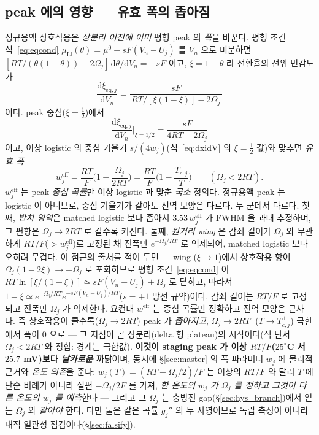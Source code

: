 \documentclass[11pt,a4paper]{article}
\newcommand{\dd}{\mathrm{d}}
\newcommand{\eff}{\mathrm{eff}}
\newcommand{\eq}{\mathrm{eq}}
\begin{document}
\subsection{peak 에의 영향 — 유효 폭의 좁아짐}
정규용액 상호작용은 \emph{상분리 이전에 이미} 평형 peak 의 \emph{폭}을 바꾼다. 평형 조건 식~\eqref{eq:eqcond}
$\mu_\mathrm{Li}(\theta)=\mu^0-sF(V_n-U_j)$ 를 $V_n$ 으로 미분하면 $[RT/(\theta(1-\theta))-2\Omega_j]\,\dd\theta/\dd V_n=-sF$
이고, $\xi=1-\theta$ 라 전환율의 전위 민감도가
\begin{equation}
\frac{\dd\xi_{\eq,j}}{\dd V_n}=\frac{sF}{\,RT/[\xi(1-\xi)]-2\Omega_j\,}
\label{eq:regsol_slope}
\end{equation}
이다. peak 중심($\xi=\tfrac12$)에서
\begin{equation*}
\frac{\dd\xi_{\eq,j}}{\dd V_n}\Big|_{\xi=1/2}=\frac{sF}{4RT-2\Omega_j}
\end{equation*}
이고, 이상 logistic 의 중심 기울기
$s/(4w_j)$(식~\eqref{eq:dxidV} 의 $\xi=\tfrac12$ 값)와 맞추면 \emph{유효 폭}
\begin{equation}
\boxed{\;w_j^\eff=\frac{RT}{F}\Big(1-\frac{\Omega_j}{2RT}\Big)=\frac{RT}{F}\Big(1-\frac{T_{c,j}}{T}\Big)\qquad(\Omega_j<2RT).\;}
\label{eq:weff}
\end{equation}
$w_j^\eff$ 는 peak \emph{중심 곡률}만 이상 logistic 과 맞춘 \emph{국소} 정의다. 정규용액 peak 는 logistic 이
아니므로, 중심 기울기가 같아도 전역 모양은 다르다. 두 군데서 다르다. 첫째, \emph{반치 영역}은 matched logistic
보다 좁아서 $3.53\,w_j^\eff$ 가 FWHM 을 과대 추정하며, 그 편향은 $\Omega_j\to2RT$ 로 갈수록 커진다. 둘째,
\emph{원거리 wing} 은 감쇠 길이가 $\Omega_j$ 와 무관하게 $RT/F$($>w_j^\eff$)로 고정된 채 진폭만
$e^{-\Omega_j/RT}$ 로 억제되어, matched logistic 보다 오히려 무겁다. 이 점근의 출처를 적어 두면 — wing
($\xi\to1$)에서 상호작용 항이 $\Omega_j(1-2\xi)\to-\Omega_j$ 로 포화하므로 평형 조건~\eqref{eq:eqcond} 이
$RT\ln[\xi/(1-\xi)]\simeq sF(V_n-U_j)+\Omega_j$ 로 닫히고, 따라서
$1-\xi\simeq e^{-\Omega_j/RT}e^{-sF(V_n-U_j)/RT}$($s{=}+1$ 방전 규약)이다. 감쇠 길이는 $RT/F$ 로 고정되고
진폭만 $\Omega_j$ 가 억제한다. 요컨대 $w^\eff$ 는 중심 곡률만 정확하고 전역 모양은 근사다. 즉 상호작용이 클수록($\Omega_j\to2RT$) peak 가 \emph{좁아지고},
$\Omega_j\to2RT^-$($T\to T_{c,j}^+$) 극한에서 폭이 $0$ 으로 — 그 지점이 곧 상분리(delta 형 plateau)의 시작이다(식 단서
$\Omega_j<2RT$ 와 정합: 경계는 극한값). \textbf{이것이
staging peak 가 이상 $RT/F$($25^\circ$C 서 $25.7$ mV)보다 \emph{날카로운} 까닭}이며, 동시에 \S\ref{sec:master} 의 폭
파라미터 $w_j$ 에 물리적 근거와 \emph{온도 의존}을
준다: $w_j(T)=(RT-\Omega_j/2)/F$ 는 이상의 $RT/F$ 와 달리 $T$ 에 단순 비례가 아니라 절편 $-\Omega_j/2F$ 를 가져,
\emph{한 온도의 $w_j$ 가 $\Omega_j$ 를 정하고 그것이 다른 온도의 $w_j$ 를 예측}한다 — 그리고 그 $\Omega_j$ 는
충방전 gap(\S\ref{sec:hys_branch})에서 얻는 $\Omega_j$ 와 \emph{같아야} 한다. 다만 둘은 같은 곡률 $g_j''$ 의
두 사영이므로 독립 측정이 아니라 내적 일관성 점검이다(\S\ref{sec:falsify}).
\end{document}
